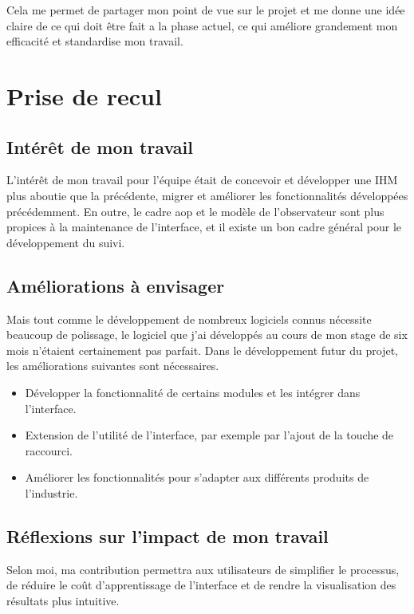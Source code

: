Cela me permet de partager mon point de vue sur le projet et me donne une idée claire de ce qui doit être fait a la phase actuel, ce qui améliore grandement mon efficacité et standardise mon travail.

\newpage
\section{Prise de recul}
\subsection{Intérêt de mon travail}
L'intérêt de mon travail pour l'équipe était de concevoir et développer une IHM plus aboutie que la précédente, migrer et améliorer les fonctionnalités développées précédemment. En outre, le cadre aop et le modèle de l'observateur sont plus propices à la maintenance de l'interface, et il existe un bon cadre général pour le développement du suivi. 

\subsection{Améliorations à envisager}
Mais tout comme le développement de nombreux logiciels connus nécessite beaucoup de polissage, le logiciel que j'ai développés au cours de mon stage de six mois n'étaient certainement pas parfait. Dans le développement futur du projet, les améliorations suivantes sont nécessaires.
\begin{itemize}
    \item Développer la fonctionnalité de certains modules et les intégrer dans l'interface.
    \item Extension de l'utilité de l'interface, par exemple par l'ajout de la touche de raccourci.
    \item Améliorer les fonctionnalités pour s'adapter aux différents produits de l'industrie.
\end{itemize}

\subsection{Réflexions sur l’impact de mon travail}
Selon moi, ma contribution permettra aux utilisateurs de simplifier le processus, de réduire le coût d'apprentissage de l'interface et de rendre la visualisation des résultats plus intuitive.